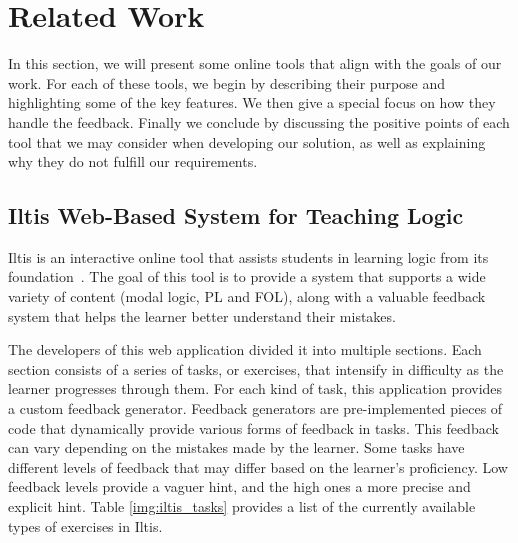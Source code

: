 
%

\chapter{Related Work}
\label{chap:related}

In this section, we will present some online tools that align with the goals of our work. For each of these tools, we begin by describing their purpose and highlighting some of the key features. We then give a special focus on how they handle the feedback. Finally we conclude by discussing the positive points of each tool that we may consider when developing our solution, as well as explaining why they do not fulfill our requirements.

\section{Iltis Web-Based System for Teaching Logic}
\label{chap:iltis}

Iltis is an interactive online tool that assists students in learning logic from its foundation~\cite{geck_iltis, geck_2018_introduction}. The goal of this tool is to provide a system that supports a wide variety of content (modal logic, \gls{PL} and \gls{FOL}), along with a valuable feedback system that helps the learner better understand their mistakes. 

The developers of this web application divided it into multiple sections. Each section consists of a series of tasks, or exercises, that intensify in difficulty as the learner progresses through them. For each kind of task, this application provides a custom feedback generator. Feedback generators are pre-implemented pieces of code that dynamically provide various forms of feedback in tasks. This feedback can vary depending on the mistakes made by the learner. Some tasks have different levels of feedback that may differ based on the learner’s proficiency. Low feedback levels provide a vaguer hint, and the high ones a more precise and explicit hint. Table \ref{img:iltis_tasks} provides a list of the currently available types of exercises in Iltis.

